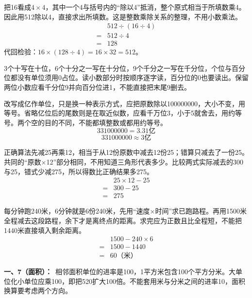 \documentclass[multi=snippet,border=0pt]{standalone}
\newenvironment{snippet}[3]{\begin{minipage}{#1bp}\color{answerred}\fontsize{#2}{#3}\selectfont\raggedright}{\end{minipage}}
\begin{document}
\begin{snippet}{505}{11.5}{14}把16看成\(4\times4\)，其中一个4与括号内的“除以4”抵消，整个原式相当于所填数乘4。因此用512除以4，直接求出所填数。这是整数乘除关系的整理，不用小数乘法。\[\begin{aligned}&512\div(16\div4)\\={}&512\div4\\={}&128\end{aligned}\]代回检验：\(16\times(128\div4)=16\times32=512\)。\end{snippet}
\begin{snippet}{505}{11.5}{14}3个十写在十位，6个十分之一写在十分位，9个千分之一写在千分位，个位与百分位都没有单位须用0占位。读小数部分时按顺序逐字读，百分位的0也要读出。保留两位小数应看千分位9并向百分位进1，不能直接把末尾9删去。\end{snippet}
\begin{snippet}{505}{11.5}{14}改写成亿作单位，只是换一种表示方式，应把原数除以100000000，大小不变，用等号。省略亿位后的尾数则是在取近似数，应看千万位3，小于5就舍去，用约等号。两个空的目的不同，不能都填整数或都用约等号。\[331000000=3.31\text{亿}\]\[331000000\approx3\text{亿}\]\end{snippet}
\begin{snippet}{505}{11.5}{14}正确算法先减25再乘12，相当于从12份原数中减去12份25；错算只减去了一份25。共同的“原数×12”部分相同，不用知道三角形代表多少。比较两式实际减去的300与25，错式少减275，所以得数比正确结果多275。\[\begin{aligned}&25\times12-25\\={}&300-25\\={}&275\end{aligned}\]\end{snippet}
\begin{snippet}{505}{11.5}{14}每分钟跑240米，6分钟就是6份240米，先用“速度×时间”求已跑路程。再用1500米全程减去这段路程，余下才是离终点的距离。求完应为正数且比全程短，不能把1440米直接填入剩余距离。\[\begin{aligned}&1500-240\times6\\={}&1500-1440\\={}&60\text{（米）}\end{aligned}\]\end{snippet}
\begin{snippet}{505}{11.5}{14}\textbf{一、7（面积）：}\ 相邻面积单位的进率是100，1平方米包含100个平方分米。大单位化小单位应乘100，即把520扩大100倍。不能套用米与分米之间的进率10，面积换算要考虑两个方向。\end{snippet}
\end{document}
